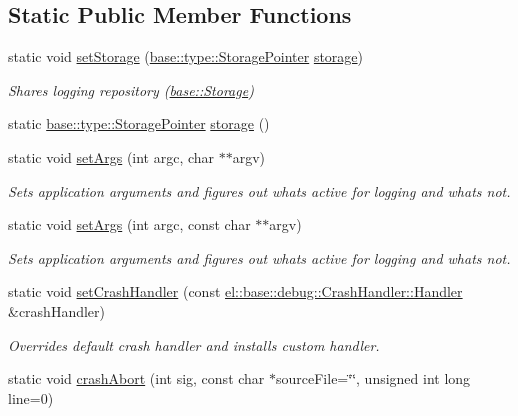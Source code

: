 \subsection*{Static Public Member Functions}
\begin{DoxyCompactItemize}
\item 
static void \hyperlink{classel_1_1_helpers_af78fd39725281e3dddd7c0fbdc14f11f}{set\+Storage} (\hyperlink{namespaceel_1_1base_1_1type_a3c34822c3825018aca1526f2289b7976}{base\+::type\+::\+Storage\+Pointer} \hyperlink{classel_1_1_helpers_a13a5365de36b3af27660cf9b358829d3}{storage})
\begin{DoxyCompactList}\small\item\em Shares logging repository (\hyperlink{classel_1_1base_1_1_storage}{base\+::\+Storage}) \end{DoxyCompactList}\item 
static \hyperlink{namespaceel_1_1base_1_1type_a3c34822c3825018aca1526f2289b7976}{base\+::type\+::\+Storage\+Pointer} \hyperlink{classel_1_1_helpers_a13a5365de36b3af27660cf9b358829d3}{storage} ()
\item 
static void \hyperlink{classel_1_1_helpers_a68748f618a0c2840b96dc12532b09bf0}{set\+Args} (int argc, char $\ast$$\ast$argv)
\begin{DoxyCompactList}\small\item\em Sets application arguments and figures out whats active for logging and whats not. \end{DoxyCompactList}\item 
static void \hyperlink{classel_1_1_helpers_afac7a023e2c13a62d0295cf0239eb848}{set\+Args} (int argc, const char $\ast$$\ast$argv)
\begin{DoxyCompactList}\small\item\em Sets application arguments and figures out whats active for logging and whats not. \end{DoxyCompactList}\item 
static void \hyperlink{classel_1_1_helpers_a4155f6fff0074ad93aa56fd7fe064097}{set\+Crash\+Handler} (const \hyperlink{classel_1_1base_1_1debug_1_1_crash_handler_aebf80d2fd5180d9c56db5a7e9abc7ad9}{el\+::base\+::debug\+::\+Crash\+Handler\+::\+Handler} \&crash\+Handler)
\begin{DoxyCompactList}\small\item\em Overrides default crash handler and installs custom handler. \end{DoxyCompactList}\item 
static void \hyperlink{classel_1_1_helpers_a6e16f0e07ce40e0659fcfec4ea5b6fe1}{crash\+Abort} (int sig, const char $\ast$source\+File=\char`\"{}\char`\"{}, unsigned int long line=0)

\end{DoxyCompactItemize}
